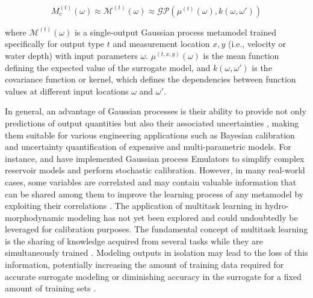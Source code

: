 \documentclass[draft,linenumbers,onecolumn]{agujournal2019} %
\begin{document}
\[
M_c^{(t)}(\omega) \approx \mathcal{M}^{(t)}(\omega) \approx \mathcal{GP}(\mu^{(t)}(\omega), k(\omega, \omega'))
\]

where $\mathcal{M}^{(t)}(\omega)$ is a single-output Gaussian process metamodel trained specifically for output type $t$ and measurement location $x,y$  (i.e., velocity or water depth) with input parameters $\omega$.  $\mu^{(t,x,y)}(\omega)$ is the mean function defining the expected value of the surrogate model, and $k(\omega, \omega')$ is the covariance function or kernel, which defines the dependencies between function values at different input locations $\omega$ and $\omega'$. 

In general, an advantage of Gaussian processes is their ability to provide not only predictions of output quantities but also their associated uncertainties \cite{lindholm2022machine}, making them suitable for various engineering applications such as Bayesian calibration and uncertainty quantification of expensive and multi-parametric models. For instance,  and  have implemented Gaussian process Emulators to simplify complex reservoir models and perform stochastic calibration. However, in many real-world cases, some variables are correlated and may contain valuable information that can be shared among them to improve the learning process of any metamodel by exploiting their correlations \cite{breiman1997predicting}. The application of multitask learning in hydro-morphodynamic modeling has not yet been explored and could undoubtedly be leveraged for calibration purposes. The fundamental concept of multitask learning is the sharing of knowledge acquired from several tasks while they are simultaneously trained \cite{caruana1997multitask}. Modeling outputs in isolation may lead to the loss of this information, potentially increasing the amount of training data required for accurate surrogate modeling or diminishing accuracy in the surrogate for a fixed amount of training sets \cite{liu2018remarks}.
\end{document}
